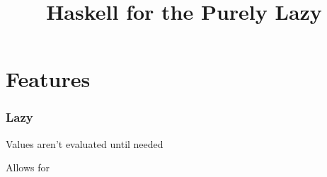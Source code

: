 \documentclass{beamer}
\title{Haskell for the Purely Lazy}
\begin{document}
\frame{\titlepage}

\section{Features}

\begin{frame}
  \frametitle{Lazy}

  Values aren't evaluated until needed

  Allows for
\end{frame}
\end{document}
